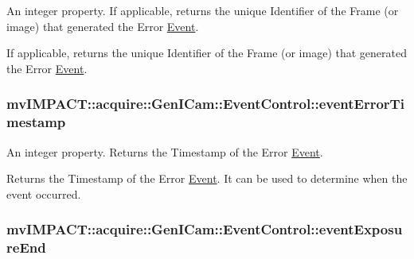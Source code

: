 An integer property. If applicable, returns the unique Identifier of the Frame (or image) that generated the Error \hyperlink{classmv_i_m_p_a_c_t_1_1acquire_1_1_event}{Event}. 

If applicable, returns the unique Identifier of the Frame (or image) that generated the Error \hyperlink{classmv_i_m_p_a_c_t_1_1acquire_1_1_event}{Event}. \hypertarget{classmv_i_m_p_a_c_t_1_1acquire_1_1_gen_i_cam_1_1_event_control_ac871b5c03dcd067b4a46162e003c2e50}{
\subsubsection[{event\+Error\+Timestamp}]{ mv\+I\+M\+P\+A\+C\+T\+::acquire\+::\+Gen\+I\+Cam\+::\+Event\+Control\+::event\+Error\+Timestamp}}\label{classmv_i_m_p_a_c_t_1_1acquire_1_1_gen_i_cam_1_1_event_control_ac871b5c03dcd067b4a46162e003c2e50}


An integer property. Returns the Timestamp of the Error \hyperlink{classmv_i_m_p_a_c_t_1_1acquire_1_1_event}{Event}. 

Returns the Timestamp of the Error \hyperlink{classmv_i_m_p_a_c_t_1_1acquire_1_1_event}{Event}. It can be used to determine when the event occurred. \hypertarget{classmv_i_m_p_a_c_t_1_1acquire_1_1_gen_i_cam_1_1_event_control_a1c83aeb5d7fd6cf3ee8bf25b19a3331f}{
\subsubsection[{event\+Exposure\+End}]{ mv\+I\+M\+P\+A\+C\+T\+::acquire\+::\+Gen\+I\+Cam\+::\+Event\+Control\+::event\+Exposure\+End}}\label{classmv_i_m_p_a_c_t_1_1acquire_1_1_gen_i_cam_1_1_event_control_a1c83aeb5d7fd6cf3ee8bf25b19a3331f}


